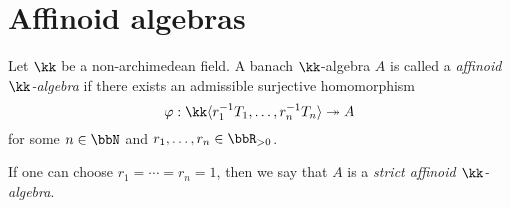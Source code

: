 \section{Affinoid algebras}


    \begin{definition}\label{def:affinoid_algebras}
        Let \(\kk\) be a non-archimedean field. 
        A banach \(\kk\)-algebra \(A\) is called a \emph{ affinoid \(\kk\)-algebra} if there exists an admissible surjective homomorphism
        \[
            \varphi: \kk\langle r_1^{-1} T_1, \ldots, r_n^{-1} T_n \rangle \twoheadrightarrow A
        \]
        for some \(n \in \bbN\) and \(r_1, \ldots, r_n \in \bbR_{>0}\).

        If one can choose \(r_1 = \cdots = r_n = 1\), then we say that \(A\) is a \emph{strict affinoid \(\kk\)-algebra}.
    \end{definition}